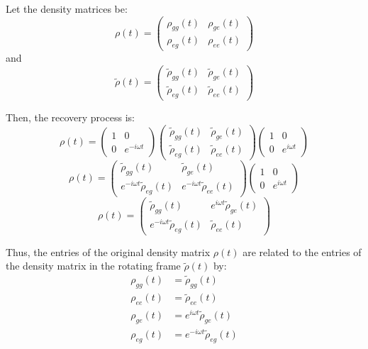 Let the density matrices be:
\[
	\rho(t) =
	\begin{pmatrix}
		\rho_{gg}(t) & \rho_{ge}(t) \\
		\rho_{eg}(t) & \rho_{ee}(t)
	\end{pmatrix}
\]
and
\[
	\tilde{\rho}(t) =
	\begin{pmatrix}
		\tilde{\rho}_{gg}(t) & \tilde{\rho}_{ge}(t) \\
		\tilde{\rho}_{eg}(t) & \tilde{\rho}_{ee}(t)
	\end{pmatrix}
\]

Then, the recovery process is:
\[
	\rho(t) =
	\begin{pmatrix}
		1 & 0              \\
		0 & e^{-i\omega t}
	\end{pmatrix}
	\begin{pmatrix}
		\tilde{\rho}_{gg}(t) & \tilde{\rho}_{ge}(t) \\
		\tilde{\rho}_{eg}(t) & \tilde{\rho}_{ee}(t)
	\end{pmatrix}
	\begin{pmatrix}
		1 & 0             \\
		0 & e^{i\omega t}
	\end{pmatrix}
\]
\[
	\rho(t) =
	\begin{pmatrix}
		\tilde{\rho}_{gg}(t)                & \tilde{\rho}_{ge}(t)                \\
		e^{-i\omega t} \tilde{\rho}_{eg}(t) & e^{-i\omega t} \tilde{\rho}_{ee}(t)
	\end{pmatrix}
	\begin{pmatrix}
		1 & 0             \\
		0 & e^{i\omega t}
	\end{pmatrix}
\]
\[
	\rho(t) =
	\begin{pmatrix}
		\tilde{\rho}_{gg}(t)                & e^{i\omega t} \tilde{\rho}_{ge}(t) \\
		e^{-i\omega t} \tilde{\rho}_{eg}(t) & \tilde{\rho}_{ee}(t)
	\end{pmatrix}
\]

Thus, the entries of the original density matrix $\rho(t)$ are related to the entries of the density matrix in the rotating frame $\tilde{\rho}(t)$ by:
\begin{align*}
	\rho_{gg}(t) & = \tilde{\rho}_{gg}(t)                \\
	\rho_{ee}(t) & = \tilde{\rho}_{ee}(t)                \\
	\rho_{ge}(t) & = e^{i\omega t} \tilde{\rho}_{ge}(t)  \\
	\rho_{eg}(t) & = e^{-i\omega t} \tilde{\rho}_{eg}(t)
\end{align*}



